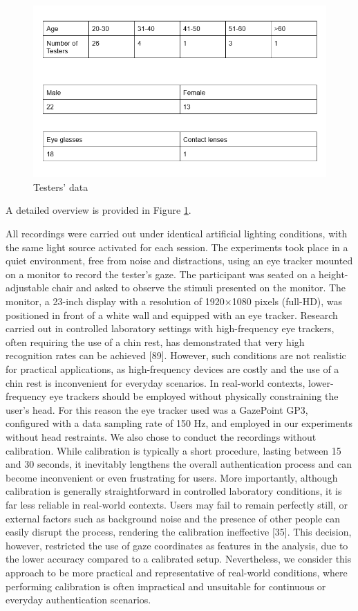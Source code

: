 \documentclass{article}
\begin{document}
\begin{figure}[ht]
    \centering
    \includegraphics[width = 0.6
    \textwidth]{Images/Experiment/tester.png}
    \caption{Testers' data}
    \label{fig:test}
\end{figure}

A detailed overview is provided in Figure \ref{fig:test}.

All recordings were carried out under identical artificial lighting conditions, with the same light source activated for each session.
The experiments took place in a quiet environment, free from noise and distractions, using an eye tracker mounted on a monitor to record the tester's gaze.
The participant was seated on a height-adjustable chair and asked to observe the stimuli presented on the monitor. 
The monitor, a 23-inch display with a resolution of 1920×1080 pixels (full-HD), was positioned in front of a white wall and equipped with an eye tracker. 
Research carried out in controlled laboratory settings with high-frequency eye trackers, often requiring the use of a chin rest, has demonstrated that very high recognition rates can be achieved [89].
However, such conditions are not realistic for practical applications, as high-frequency devices are costly and the use of a chin rest is inconvenient for everyday scenarios. 
In real-world contexts, lower-frequency eye trackers should be employed without physically constraining the user's head. 
For this reason the eye tracker used was a GazePoint GP3, configured with a data sampling rate of 150 Hz, and employed in our experiments without head restraints.
We also chose to conduct the recordings without calibration. 
While calibration is typically a short procedure, lasting between 15 and 30 seconds, it inevitably lengthens the overall authentication process and can become inconvenient or even frustrating for users. 
More importantly, although calibration is generally straightforward in controlled laboratory conditions, it is far less reliable in real-world contexts. 
Users may fail to remain perfectly still, or external factors such as background noise and the presence of other people can easily disrupt the process, rendering the calibration ineffective [35].
This decision, however, restricted the use of gaze coordinates as features in the analysis, due to the lower accuracy compared to a calibrated setup.
Nevertheless, we consider this approach to be more practical and representative of real-world conditions, where performing calibration is often impractical and unsuitable for continuous or everyday authentication scenarios.
\end{document}
